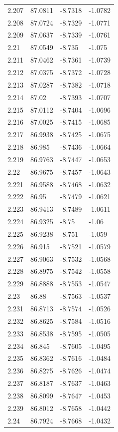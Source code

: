 \begin{tabular}{llll}
2.207 & 87.0811 & -8.7318 & -1.0782 \\
2.208 & 87.0724 & -8.7329 & -1.0771 \\
2.209 & 87.0637 & -8.7339 & -1.0761 \\
2.21 & 87.0549 & -8.735 & -1.075 \\
2.211 & 87.0462 & -8.7361 & -1.0739 \\
2.212 & 87.0375 & -8.7372 & -1.0728 \\
2.213 & 87.0287 & -8.7382 & -1.0718 \\
2.214 & 87.02 & -8.7393 & -1.0707 \\
2.215 & 87.0112 & -8.7404 & -1.0696 \\
2.216 & 87.0025 & -8.7415 & -1.0685 \\
2.217 & 86.9938 & -8.7425 & -1.0675 \\
2.218 & 86.985 & -8.7436 & -1.0664 \\
2.219 & 86.9763 & -8.7447 & -1.0653 \\
2.22 & 86.9675 & -8.7457 & -1.0643 \\
2.221 & 86.9588 & -8.7468 & -1.0632 \\
2.222 & 86.95 & -8.7479 & -1.0621 \\
2.223 & 86.9413 & -8.7489 & -1.0611 \\
2.224 & 86.9325 & -8.75 & -1.06 \\
2.225 & 86.9238 & -8.751 & -1.059 \\
2.226 & 86.915 & -8.7521 & -1.0579 \\
2.227 & 86.9063 & -8.7532 & -1.0568 \\
2.228 & 86.8975 & -8.7542 & -1.0558 \\
2.229 & 86.8888 & -8.7553 & -1.0547 \\
2.23 & 86.88 & -8.7563 & -1.0537 \\
2.231 & 86.8713 & -8.7574 & -1.0526 \\
2.232 & 86.8625 & -8.7584 & -1.0516 \\
2.233 & 86.8538 & -8.7595 & -1.0505 \\
2.234 & 86.845 & -8.7605 & -1.0495 \\
2.235 & 86.8362 & -8.7616 & -1.0484 \\
2.236 & 86.8275 & -8.7626 & -1.0474 \\
2.237 & 86.8187 & -8.7637 & -1.0463 \\
2.238 & 86.8099 & -8.7647 & -1.0453 \\
2.239 & 86.8012 & -8.7658 & -1.0442 \\
2.24 & 86.7924 & -8.7668 & -1.0432 \\

\end{tabular}
